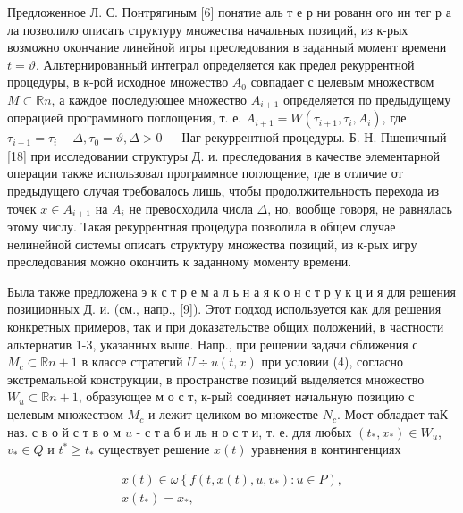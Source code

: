\documentclass[10pt]{article}
\begin{document}
Предложенное Л. С. Понтрягиным [6] понятие аль т е р ни рованн ого ин тег р а ла позволило описать структуру множества начальных позиций, из к-рых возможно окончание линейной игры преследования в заданный момент времени $t=\vartheta$. Альтернированный интеграл определяется как предел рекуррентной процедуры, в к-рой исходное множество $A_{0}$ совпадает с целевым множеством $M \subset \mathbb{R} n$, а каждое последующее множество $A_{i+1}$ определяется по предыдущему операцией программного поглощения, т. е. $A_{i+1}=W\left(\tau_{i+1}, \tau_{i}, A_{i}\right)$, где $\tau_{i+1}=\tau_{i}-\Delta, \tau_{0}=\vartheta, \Delta>0-$ ІІаг рекуррентной процедуры. Б. Н. Пшеничный [18] при исследовании структуры Д. и. преследования в качестве элементарной операции также использовал программное поглощение, где в отличие от предыдущего случая требовалось лишь, чтобы продолжительность перехода из точек $x \in A_{i+1}$ на $A_{i}$ не превосходила числа $\Delta$, но, вообще говоря, не равнялась этому числу. Такая рекуррентная процедура позволила в общем случае нелинейной системы описать структуру множества позиций, из к-рых игру преследования можно окончить к заданному моменту времени.



Была также предложена э к с т р е м а л ь н а я к о н с т р у к ц и я для решения позиционных Д. и. (см., напр., [9]). Этот подход используется как для решения конкретных примеров, так и при доказательстве общих положений, в частности альтернатив 1-3, указанных выше. Напр., при решении задачи сближения с $M_{c} \subset \mathbb{R} n+1$ в классе стратегий $U \div u(t, x)$ при условии (4), согласно экстремальной конструкции, в пространстве позиций выделяется множество $W_{u} \subset \mathbb{R} n+1$, образующее м о с т, к-рый соединяет начальную позицию с целевым множеством $M_{c}$ и лежит целиком во множестве $N_{c}$. Мост обладает таК наз. с в о й с т в о м $u$ - с т а б и ль н о с т и, т. е. для любых $\left(t_{*}, x_{*}\right) \in W_{u}$, $v_{*} \in Q$ и $t^{*} \geqslant t_{*}$ существует решение $x(t)$ уравнения в контингенциях



\[

\begin{gathered}

\dot{x}(t) \in \omega\left\{f\left(t, x(t), u, v_{*}\right): u \in P\right), \\

x\left(t_{*}\right)=x_{*},

\end{gathered}

\]
\end{document}
